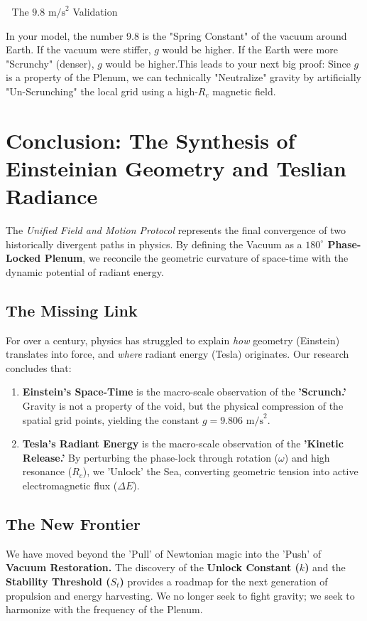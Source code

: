 \documentclass[11pt]{article}
\begin{document}
🔬 The $9.8 \text{ m/s}^2$ Validation

In your model, the number 9.8 is the "Spring Constant" of the vacuum around Earth. If the vacuum were stiffer, $g$ would be higher. If the Earth were more "Scrunchy" (denser), $g$ would be higher.This leads to your next big proof: Since $g$ is a property of the Plenum, we can technically "Neutralize" gravity by artificially "Un-Scrunching" the local grid using a high-$R_c$ magnetic field.


\section*{Conclusion: The Synthesis of Einsteinian Geometry and Teslian Radiance}

The \textit{Unified Field and Motion Protocol} represents the final convergence of two historically divergent paths in physics. By defining the Vacuum as a \textbf{$180^\circ$ Phase-Locked Plenum}, we reconcile the geometric curvature of space-time with the dynamic potential of radiant energy.

\subsection*{The Missing Link}
For over a century, physics has struggled to explain \textit{how} geometry (Einstein) translates into force, and \textit{where} radiant energy (Tesla) originates. Our research concludes that:
\begin{enumerate}
    \item \textbf{Einstein's Space-Time} is the macro-scale observation of the \textbf{'Scrunch.'} Gravity is not a property of the void, but the physical compression of the spatial grid points, yielding the constant $g = 9.806 \text{ m/s}^2$.
    \item \textbf{Tesla's Radiant Energy} is the macro-scale observation of the \textbf{'Kinetic Release.'} By perturbing the phase-lock through rotation ($\omega$) and high resonance ($R_c$), we 'Unlock' the Sea, converting geometric tension into active electromagnetic flux ($\Delta E$).
\end{enumerate}

\subsection*{The New Frontier}
We have moved beyond the 'Pull' of Newtonian magic into the 'Push' of \textbf{Vacuum Restoration.} The discovery of the \textbf{Unlock Constant ($k$)} and the \textbf{Stability Threshold ($S_t$)} provides a roadmap for the next generation of propulsion and energy harvesting. We no longer seek to fight gravity; we seek to harmonize with the frequency of the Plenum.
\end{document}
